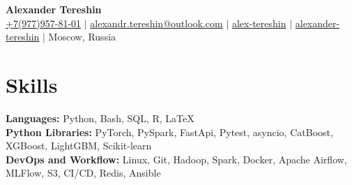 \documentclass[letterpaper,11pt]{article}
\newcommand{\resumeSubHeadingListStart}{\begin{itemize}[leftmargin=0.15in, label={}]}
\newcommand{\resumeSubHeadingListEnd}{\end{itemize}}
\begin{document}

\begin{center}
    \textbf{\Huge Alexander Tereshin} \\ \vspace{8pt}
    \small
    \faMobile \hspace{.5pt} \href{tel:+7(977)957-81-01}{+7(977)957-81-01}
    $|$
    \faAt \hspace{.5pt} \href{mailto:alexandr.tereshin@outlook.com}{alexandr.tereshin@outlook.com}
    $|$
    \faLinkedinSquare \hspace{.5pt} \href{https://www.linkedin.com/in/alex-tereshin}{alex-tereshin}
    $|$
    \faGithub \hspace{.5pt} \href{https://github.com/alexander-tereshin}{alexander-tereshin}
    $|$
    \faMapMarker \hspace{.5pt} Moscow, Russia
\end{center}




\section{Skills}
  \vspace{2pt}
  \resumeSubHeadingListStart
    \small{\item{
        \textbf{Languages:}{ Python, Bash, SQL, R, LaTeX} \\ \vspace*{3pt}
        \textbf{Python Libraries:}{ PyTorch, PySpark, FastApi, Pytest, asyncio, CatBoost, XGBoost, LightGBM, Scikit-learn} \\ \vspace*{3pt}
        \textbf{DevOps and Workflow:}{ Linux, Git, Hadoop, Spark, Docker, Apache Airflow, MLFlow, S3, CI/CD, Redis, Ansible} \\ \vspace*{3pt}
    }}
  \resumeSubHeadingListEnd



\end{document}
